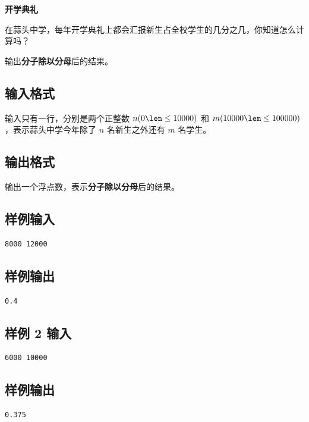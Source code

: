 \documentclass{article}
\newcommand{\problemname}[1]{\begin{center}\Large\bfseries #1\end{center}}
\begin{document}
\problemname{开学典礼}

在蒜头中学，每年开学典礼上都会汇报新生占全校学生的几分之几，你知道怎么计算吗？

输出\textbf{分子除以分母}后的结果。

\subsection*{输入格式}
输入只有一行，分别是两个正整数 $n(0\len\le10000)$ 和 $m(10000\lem\le100000)$ ，表示蒜头中学今年除了 $n$ 名新生之外还有 $m$ 名学生。

\subsection*{输出格式}
输出一个浮点数，表示\textbf{分子除以分母}后的结果。

\subsection*{样例输入}
\begin{verbatim}
8000 12000
\end{verbatim}

\subsection*{样例输出}
\begin{verbatim}
0.4
\end{verbatim}

\subsection*{样例 2 输入}
\begin{verbatim}
6000 10000
\end{verbatim}

\subsection*{样例输出}
\begin{verbatim}
0.375
\end{verbatim}
\end{document}
